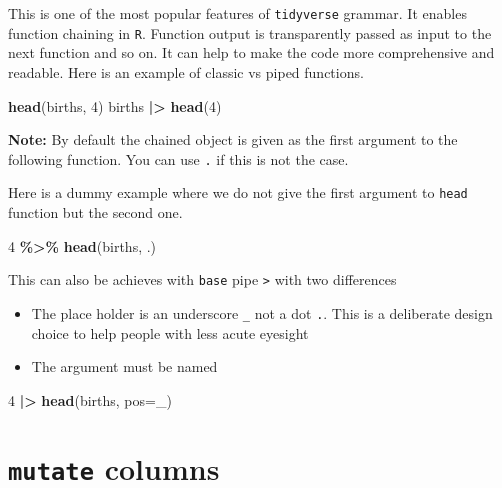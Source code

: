 \documentclass[
]{book}
\newenvironment{Shaded}{\begin{snugshade}}{\end{snugshade}}
\newcommand{\AttributeTok}[1]{\textcolor[rgb]{0.13,0.29,0.53}{#1}}
\newcommand{\DecValTok}[1]{\textcolor[rgb]{0.00,0.00,0.81}{#1}}
\newcommand{\FunctionTok}[1]{\textcolor[rgb]{0.13,0.29,0.53}{\textbf{#1}}}
\newcommand{\NormalTok}[1]{#1}
\newcommand{\SpecialCharTok}[1]{\textcolor[rgb]{0.81,0.36,0.00}{\textbf{#1}}}
\providecommand{\tightlist}{%
  \setlength{\itemsep}{0pt}\setlength{\parskip}{0pt}}
\begin{document}
This is one of the most popular features of \texttt{tidyverse} grammar. It enables function chaining in
\texttt{R}. Function output is transparently passed as input to the next function and so on.
It can help to make the code more comprehensive and readable.
Here is an example of classic vs piped functions.

\begin{Shaded}
\begin{Highlighting}[]
\FunctionTok{head}\NormalTok{(births, }\DecValTok{4}\NormalTok{)}
\NormalTok{births }\SpecialCharTok{|\textgreater{}} \FunctionTok{head}\NormalTok{(}\DecValTok{4}\NormalTok{)}
\end{Highlighting}
\end{Shaded}

\textbf{Note:} By default the chained object is given as the first argument to the following
function.
You can use \texttt{.} if this is not the case.

Here is a dummy example where we do not give the first argument to \texttt{head} function but the second one.

\begin{Shaded}
\begin{Highlighting}[]
\DecValTok{4} \SpecialCharTok{\%\textgreater{}\%} \FunctionTok{head}\NormalTok{(births, .)}
\end{Highlighting}
\end{Shaded}

This can also be achieves with \texttt{base} pipe \texttt{\textbar{}\textgreater{}} with two differences

\begin{itemize}
\tightlist
\item
  The place holder is an underscore \texttt{\_} not a dot \texttt{.}. This is a deliberate design choice to help people with less acute eyesight
\item
  The argument must be named
\end{itemize}

\begin{Shaded}
\begin{Highlighting}[]
\DecValTok{4} \SpecialCharTok{|\textgreater{}} \FunctionTok{head}\NormalTok{(births, }\AttributeTok{pos=}\NormalTok{\_)}
\end{Highlighting}
\end{Shaded}

\section{\texorpdfstring{\texttt{mutate} columns}{mutate columns}}\label{mutate-columns}
\end{document}
